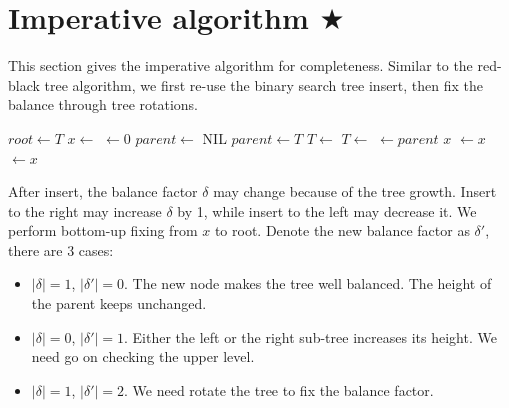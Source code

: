 \documentclass[b5paper]{article}
\begin{document}
\section{Imperative algorithm $\bigstar$}

This section gives the imperative algorithm for completeness. Similar to the red-black tree algorithm, we first re-use the binary search tree insert, then fix the balance through tree rotations.

\begin{algorithmic}[1]
  \State $root \gets T$
  \State $x \gets$ 
  \State {} $\gets 0$
  \State $parent \gets$ NIL
    \State $parent \gets T$
      \State $T \gets $ 
    \Else
      \State $T \gets $ 
    \EndIf
  \EndWhile
  \State {} $\gets parent$
   
    \State \Return $x$
    \State {} $\gets x$
  \Else
    \State {} $\gets x$
  \EndIf
  \State \Return {}
\EndFunction
\end{algorithmic}

After insert, the balance factor $\delta$ may change because of the tree growth. Insert to the right may increase $\delta$ by 1, while insert to the left may decrease it. We perform bottom-up fixing from $x$ to root. Denote the new balance factor as $\delta'$, there are 3 cases:

\begin{itemize}
\item $|\delta| = 1$, $|\delta'| = 0$. The new node makes the tree well balanced. The height of the parent keeps unchanged.

\item $|\delta| = 0$, $|\delta'| = 1$. Either the left or the right sub-tree increases its height. We need go on checking the upper level.

\item $|\delta| = 1$, $|\delta'| = 2$. We need rotate the tree to fix the balance factor.
\end{itemize}
\end{document}
